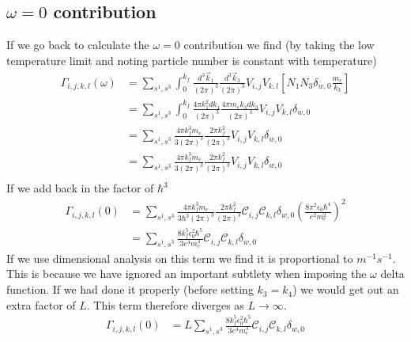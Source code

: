 \subsection{\(\omega = 0\) contribution}\label{sec:omega 0 contribution}
If we go back to calculate the
\(\omega = 0\) contribution
we find (by taking the low
temperature limit and noting
particle number is constant
with temperature)
\begin{align}
    \Gamma_{i,j, k,l}(\omega) & =
    \sum_{s^1,s^3} \int_0^{k_f}
    \frac{d^3\vec{k}_1}{{(2\pi)}^3}
    \frac{d^3\vec{k}_3}{{(2\pi)}^3}
    V_{i,j} V_{k,l} [
    N_1 N_3 \delta_{w, 0} \frac{m_e}{k_3}] \\
                              & =
    \sum_{s^1,s^3} \int_0^{k_f}
    \frac{4\pi k_1^2 dk_1}{{(2\pi)}^3}
    \frac{4 \pi m_e k_3 dk_3}{{(2\pi)}^3}
    V_{i,j} V_{k,l} \delta_{w, 0}          \\
                              & =
    \sum_{s^1,s^3} \frac{4\pi k_f^3 m_e}{3{(2\pi)}^3}
    \frac{2 \pi k_f^2}{{(2\pi)}^3}
    V_{i,j} V_{k,l} \delta_{w, 0}          \\
                              & =
    \sum_{s^1,s^3} \frac{4\pi k_f^3 m_e}{3{(2\pi)}^3}
    \frac{2 \pi k_f^2}{{(2\pi)}^3}
    V_{i,j} V_{k,l} \delta_{w, 0}          \\
\end{align}
If we add back in the factor of  \(\hbar^3\)
\begin{align}
    \Gamma_{i,j, k,l}(0) & =
    \sum_{s^1,s^3} \frac{4\pi k_f^3 m_e}{3\hbar^3{(2\pi)}^3}
    \frac{2 \pi k_f^2}{{(2\pi)}^3}
    \mathcal{C}_{i,j} \mathcal{C}_{k,l}
    \delta_{w, 0} {(\frac{8 \pi^2 \epsilon_0 \hbar^4}{e^2 m_e^2})}^2 \\
                         & =
    \sum_{s^1,s^3}
    \frac{8k_f^5 \epsilon_0^2 \hbar^5}{3e^4 m_e^3}
    \mathcal{C}_{i,j} \mathcal{C}_{k,l} \delta_{w, 0}
\end{align}
If we use dimensional analysis on this term
we find it is proportional to \(m^{-1}s^{-1}\).
This is because we have ignored an important
subtlety when imposing the \(\omega \) delta
function. If we had done it properly (before
setting \(k_3 = k_4\)) we would get
out an extra factor of \(L\). This term
therefore diverges as \(L \rightarrow \infty \).
\begin{align}
    \Gamma_{i,j, k,l}(0) & =
    L \sum_{s^1,s^3}
    \frac{8k_f^5 \epsilon_0^2 \hbar^5}{3e^4 m_e^3}
    \mathcal{C}_{i,j} \mathcal{C}_{k,l} \delta_{w, 0}
    \label{eqn:divergent expression for first integral}
\end{align}